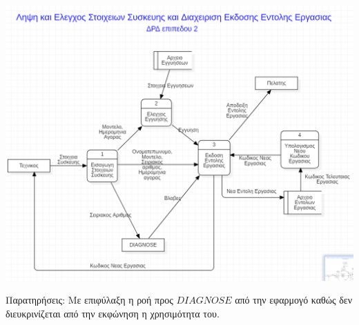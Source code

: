 \documentclass[12pt]{article}
\begin{document}
\begin{center}
\includegraphics[scale=0.7]{MerosB/B4}
\end{center}
Παρατηρήσεις: Με επιφύλαξη η ροή προς $DIAGNOSE$ από την εφαρμογό καθώς δεν διευκρινίζεται από την εκφώνηση η χρησιμότητα του.
\newpage
\end{document}
